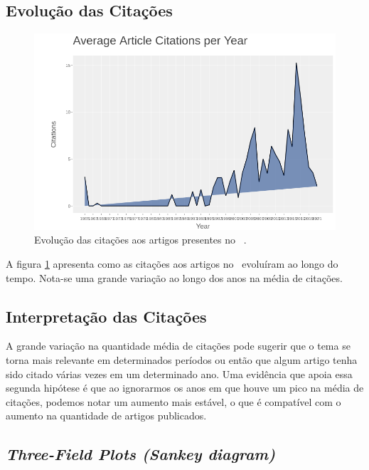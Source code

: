 \subsection{Evolução das Citações}

\begin{figure}
    \centering
    \includegraphics[width=1\textwidth]{experiments/GustavoMacCar/AnaliseBibliometrica/PsychDiseasesTech/citations-per-year.png}
    \caption{Evolução das citações aos artigos presentes no \dataset\ .}
    \label{fig:evol:anual:citations:psych}
\end{figure}

A figura \ref{fig:evol:anual:citations:psych} apresenta como as citações aos artigos no \dataset\ evoluíram ao longo do tempo. 
Nota-se uma grande variação ao longo dos anos na média de citações.

\subsection{Interpretação das Citações}
A grande variação na quantidade média de citações pode sugerir que o tema se torna mais relevante em determinados períodos ou então que algum artigo tenha sido citado várias vezes em um determinado ano. 
Uma evidência que apoia essa segunda hipótese é que ao ignorarmos os anos em que houve um pico na média de citações, podemos notar um aumento mais estável, o que é compatível com o aumento na quantidade de artigos publicados.

\subsection{\textit{Three-Field Plots (Sankey diagram)}}


